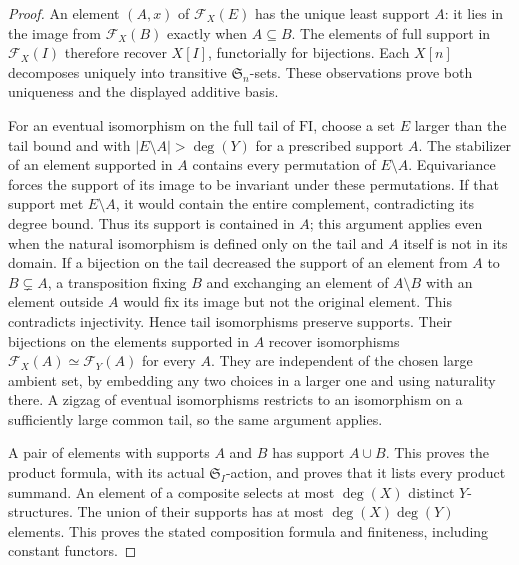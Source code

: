 \begin{proof}
An element $(A,x)$ of $\mathcal F_X(E)$ has the unique least support $A$:
it lies in the image from $\mathcal F_X(B)$ exactly when $A\subseteq B$.
The elements of full support in $\mathcal F_X(I)$ therefore recover $X[I]$,
functorially for bijections. Each $X[n]$ decomposes uniquely into transitive
$\mathfrak S_n$-sets. These observations prove both uniqueness and the
displayed additive basis.

For an eventual isomorphism on the full tail of $\mathrm{FI}$, choose a set
$E$ larger than the tail bound and with $|E\setminus A|>\deg(Y)$ for a
prescribed support $A$. The stabilizer of an element supported in $A$
contains every permutation of $E\setminus A$. Equivariance forces the
support of its image to be invariant under these permutations. If that
support met $E\setminus A$, it would contain the entire complement,
contradicting its degree bound. Thus its support is contained in $A$;
this argument applies even when the natural isomorphism is defined only
on the tail and $A$ itself is not in its domain. If a bijection on the
tail decreased the support of an element from $A$ to $B\subsetneq A$, a
transposition fixing $B$ and exchanging an element of $A\setminus B$ with
an element outside $A$ would fix its image but not the original element.
This contradicts injectivity. Hence tail isomorphisms preserve supports.
Their bijections on the elements supported in $A$ recover isomorphisms
$\mathcal F_X(A)\simeq\mathcal F_Y(A)$ for every $A$. They are independent
of the chosen large ambient set, by embedding any two choices in a larger
one and using naturality there. A zigzag of eventual
isomorphisms restricts to an isomorphism on a sufficiently large common
tail, so the same argument applies.

A pair of elements with supports $A$ and $B$ has support $A\cup B$.
This proves the product formula, with its actual $\mathfrak S_I$-action,
and proves that it lists every product summand. An element of a composite
selects at most $\deg(X)$ distinct $Y$-structures. The union of their
supports has at most $\deg(X)\deg(Y)$ elements. This proves the stated
composition formula and finiteness, including constant functors.


\end{proof}
